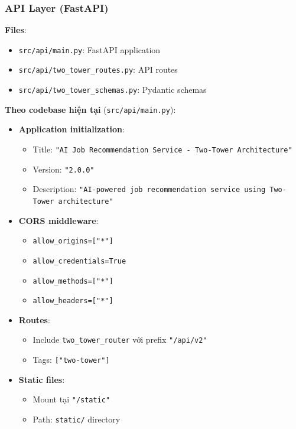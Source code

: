 \subsubsection{API Layer (FastAPI)}

\textbf{Files}: 
\begin{itemize}
    \item \texttt{src/api/main.py}: FastAPI application
    \item \texttt{src/api/two\_tower\_routes.py}: API routes
    \item \texttt{src/api/two\_tower\_schemas.py}: Pydantic schemas
\end{itemize}

\textbf{Theo codebase hiện tại} (\texttt{src/api/main.py}):

\begin{itemize}
    \item \textbf{Application initialization}:
    \begin{itemize}
        \item Title: \texttt{"AI Job Recommendation Service - Two-Tower Architecture"}
        \item Version: \texttt{"2.0.0"}
        \item Description: \texttt{"AI-powered job recommendation service using Two-Tower architecture"}
    \end{itemize}
    
    \item \textbf{CORS middleware}:
    \begin{itemize}
        \item \texttt{allow\_origins=["*"]}
        \item \texttt{allow\_credentials=True}
        \item \texttt{allow\_methods=["*"]}
        \item \texttt{allow\_headers=["*"]}
    \end{itemize}
    
    \item \textbf{Routes}:
    \begin{itemize}
        \item Include \texttt{two\_tower\_router} với prefix \texttt{"/api/v2"}
        \item Tags: \texttt{["two-tower"]}
    \end{itemize}
    
    \item \textbf{Static files}:
    \begin{itemize}
        \item Mount tại \texttt{"/static"}
        \item Path: \texttt{static/} directory
    \end{itemize}
    

\end{itemize}
